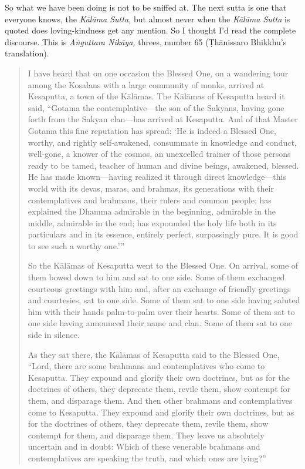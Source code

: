 So what we have been doing is not to be sniffed at. The next sutta is
one that everyone knows, the \emph{Kālāma Sutta,} but almost never when
the \emph{Kālāma Sutta} is quoted does loving-kindness get any mention.
So I thought I’d read the complete discourse. This is \emph{Aṅguttara
Nikāya,} threes, number 65 (Ṭhānissaro Bhikkhu’s translation).

\begin{quotation}
I have heard that on one occasion the Blessed One, on a wandering tour
among the Kosalans with a large community of monks, arrived at
Kesaputta, a town of the Kālāmas. The Kālāmas of Kesaputta heard it
said, “Gotama the contemplative—the son of the Sakyans, having gone
forth from the Sakyan clan—has arrived at Kesaputta. And of that Master
Gotama this fine reputation has spread: ‘He is indeed a Blessed One,
worthy, and rightly self-awakened, consummate in knowledge and conduct,
well-gone, a knower of the cosmos, an unexcelled trainer of those
persons ready to be tamed, teacher of human and divine beings, awakened,
blessed. He has made known—having realized it through direct
knowledge—this world with its devas, maras, and brahmas, its generations
with their contemplatives and brahmans, their rulers and common people;
has explained the Dhamma admirable in the beginning, admirable in the
middle, admirable in the end; has expounded the holy life both in its
particulars and in its essence, entirely perfect, surpassingly pure. It
is good to see such a worthy one.’”

So the Kālāmas of Kesaputta went to the Blessed One. On arrival, some of
them bowed down to him and sat to one side. Some of them exchanged
courteous greetings with him and, after an exchange of friendly
greetings and courtesies, sat to one side. Some of them sat to one side
having saluted him with their hands palm-to-palm over their hearts. Some
of them sat to one side having announced their name and clan. Some of
them sat to one side in silence.

As they sat there, the Kālāmas of Kesaputta said to the Blessed One,
“Lord, there are some brahmans and contemplatives who come to Kesaputta.
They expound and glorify their own doctrines, but as for the doctrines
of others, they deprecate them, revile them, show contempt for them, and
disparage them. And then other brahmans and contemplatives come to
Kesaputta. They expound and glorify their own doctrines, but as for the
doctrines of others, they deprecate them, revile them, show contempt for
them, and disparage them. They leave us absolutely uncertain and in
doubt: Which of these venerable brahmans and contemplatives are speaking
the truth, and which ones are lying?”


\end{quotation}
